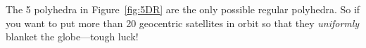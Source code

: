 The 5 polyhedra in Figure~\ref{fig:5DR} are the only possible regular
polyhedra.  So if you want to put more than 20 geocentric satellites
in orbit so that they \emph{uniformly} blanket the globe---tough luck!


\begin{problems}

\examproblems
{}

\classproblems
{}

\homeworkproblems
{}

\end{problems}


\endinput
